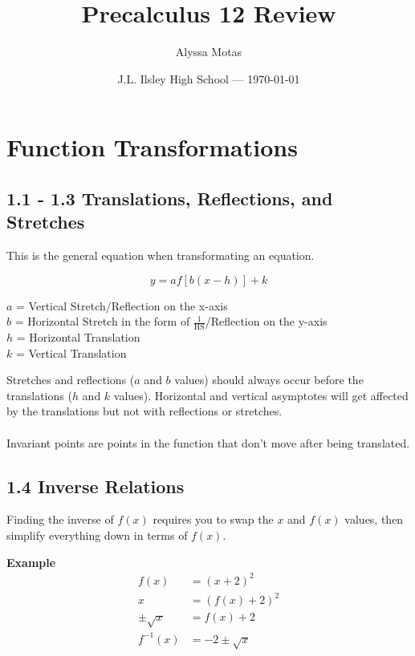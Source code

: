 \documentclass[12pt]{article}
\title{Precalculus 12 Review}
\author{Alyssa Motas}
\date{J.L. Ilsley High School --- \today}
\begin{document}
	
	\maketitle

\section{Function Transformations}
\subsection*{1.1 - 1.3 Translations, Reflections, and Stretches}

This is the general equation when transformating an equation.

\begin{tcolorbox}
	
\begin{equation*}
y=af[b(x-h)]+k
\end{equation*}

$a$ = Vertical Stretch/Reflection on the x-axis \\
$b$ = Horizontal Stretch in the form of $\frac{1}{\text{HS}}$/Reflection on the y-axis \\
$h$ = Horizontal Translation \\
$k$ = Vertical Translation

\end{tcolorbox}

Stretches and reflections ($a$ and $b$ values) should always occur before the translations ($h$ and $k$ values). Horizontal and vertical asymptotes will get affected by the translations but not with reflections or stretches.\\
\\
Invariant points are points in the function that don't move after being translated.

\subsection*{1.4 Inverse Relations}

Finding the inverse of $f(x)$ requires you to swap the $x$ and $f(x)$ values, then simplify everything down in terms of $f(x)$.

\begin{tcolorbox}

\textbf{Example} 
\begin{equation*}
\begin{align}
f(x)&=(x+2)^2 \\
x&=(f(x)+2)^2 \\
\pm \sqrt{x}&=f(x)+2 \\
f^{-1}(x)&=-2\pm \sqrt{x}
\end{align}
\end{equation*}

\end{tcolorbox}
\end{document}
